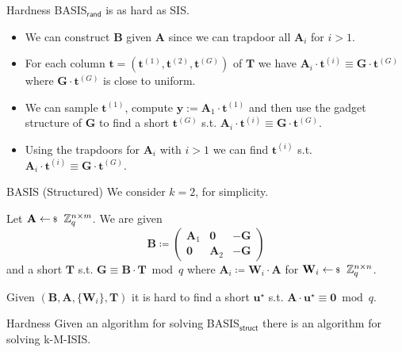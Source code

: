 \documentclass[xcolor=table,10pt,aspectratio=169]{beamer}
\renewcommand{\vec}[1]{\ensuremath{\mathbf{#1}}\xspace}
\providecommand{\mat}[1]{\ensuremath{\vec{#1}}\xspace}
\begin{document}
\begin{frame}[label={sec:orgc3cbfd2}]{Hardness}
BASIS\(_\mathsf{rand}\) is as hard as SIS.

\begin{itemize}
\item We can construct \(\vec{B}\) given \(\mat{A}\) since we can trapdoor all \(\mat{A}_{i}\) for \(i > 1\).

\item For each column \(\vec{t} = (\vec{t}^{(1)}, \vec{t}^{(2)}, \vec{t}^{(G)})\) of \(\vec{T}\) we have \(\mat{A}_{i} \cdot \vec{t}^{(i)} \equiv \vec{G} \cdot \vec{t}^{(G)}\) where \(\vec{G} \cdot \vec{t}^{(G)}\) is close to uniform.
\item We can sample \(\vec{t}^{(1)}\), compute \(\vec{y} := \mat{A}_{1} \cdot \vec{t}^{(1)}\) and then use the gadget structure of \(\vec{G}\) to find a short \(\vec{t}^{(G)}\) s.t. \(\mat{A}_{i} \cdot \vec{t}^{(i)} \equiv \vec{G} \cdot \vec{t}^{(G)}\).
\item Using the trapdoors for \(\mat{A}_{i}\) with \(i>1\) we can find \(\vec{t}^{(i)}\) s.t. \(\mat{A}_{i} \cdot \vec{t}^{(i)} \equiv \vec{G} \cdot \vec{t}^{(G)}\).
\end{itemize}
\end{frame}

\begin{frame}[label={sec:org74db1a5}]{BASIS (Structured)}
We consider \(k=2\), for simplicity.

\begin{definition}
Let \(\mat{A} \sample \ZZ_{q}^{n \times m}\). We are given
\[\vec{B} \coloneqq \begin{pmatrix}
\mat{A}_{1} & \vec{0} & - \vec{G}\\
\vec{0} & \mat{A}_{2} & -\vec{G}
\end{pmatrix}
\] and a short \(\vec{T}\) s.t. \(\vec{G} \equiv \vec{B} \cdot \vec{T} \bmod q\)
where \(\mat{A}_{i} \coloneqq  \vec{W}_{i} \cdot \mat{A}\) for \(\vec{W}_{i} \sample \ZZ_{q}^{n \times n}\).

Given \((\vec{B}, \mat{A}, \{\mat{W}_{i}\}, \vec{T})\) it is hard to find a short \(\vec{u}^{\star}\) s.t. \(\mat{A} \cdot \vec{u}^{\star} \equiv \vec{0} \bmod q\).
\end{definition}

{\footnotesize {} \par}
\end{frame}

\begin{frame}[label={sec:org7010ff3}]{Hardness}
Given an algorithm for solving BASIS\(_\mathsf{struct}\) there is an algorithm for solving k-M-ISIS.
\end{frame}
\end{document}
